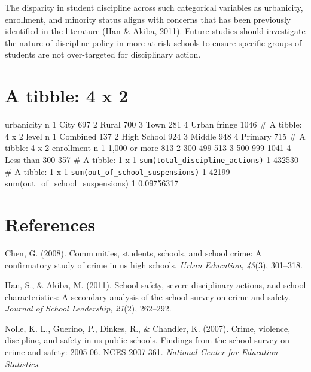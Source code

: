 \documentclass[man]{apa6}
\begin{document}
The disparity in student discipline across such categorical variables as urbanicity, enrollment, and minority status aligns with concerns that has been previously identified in the literature (Han \& Akiba, 2011). Future studies should investigate the nature of discipline policy in more at risk schools to ensure specific groups of students are not over-targeted for disciplinary action.

\hypertarget{a-tibble-4-x-2}{%
\section{A tibble: 4 x 2}\label{a-tibble-4-x-2}}

urbanicity n
1 City 697
2 Rural 700
3 Town 281
4 Urban fringe 1046
\# A tibble: 4 x 2
level n
1 Combined 137
2 High School 924
3 Middle 948
4 Primary 715
\# A tibble: 4 x 2
enrollment n
1 1,000 or more 813
2 300-499 513
3 500-999 1041
4 Less than 300 357
\# A tibble: 1 x 1
\texttt{sum(total\_discipline\_actions)}
1 432530
\# A tibble: 1 x 1
\texttt{sum(out\_of\_school\_suspensions)}
1 42199
sum(out\_of\_school\_suspensions)
1 0.09756317

\newpage

\hypertarget{references}{%
\section{References}\label{references}}

\begingroup
\setlength{\parindent}{-0.5in}
\setlength{\leftskip}{0.5in}

\hypertarget{refs}{}
\leavevmode\hypertarget{ref-chen2008}{}%
Chen, G. (2008). Communities, students, schools, and school crime: A confirmatory study of crime in us high schools. \emph{Urban Education}, \emph{43}(3), 301--318.

\leavevmode\hypertarget{ref-han2011}{}%
Han, S., \& Akiba, M. (2011). School safety, severe disciplinary actions, and school characteristics: A secondary analysis of the school survey on crime and safety. \emph{Journal of School Leadership}, \emph{21}(2), 262--292.

\leavevmode\hypertarget{ref-nolle2007}{}%
Nolle, K. L., Guerino, P., Dinkes, R., \& Chandler, K. (2007). Crime, violence, discipline, and safety in us public schools. Findings from the school survey on crime and safety: 2005-06. NCES 2007-361. \emph{National Center for Education Statistics}.

\endgroup
\end{document}
